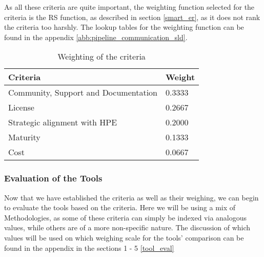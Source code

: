 As all these criteria are quite important, the weighting function selected for the criteria is the \ac{RS} function, as described in section \ref{smart_er}, 
as it does not rank the criteria too harshly.
The lookup tables for the weighting function can be found in the appendix \ref{abb:pipeline_communication_sld}.

\begin{table}[htb]
    \centering
    \begin{tabular}{|l|l|} \hline
        \textbf{Criteria}                       & \textbf{Weight}       \\ \hline
        Community, Support and  Documentation   &  0.3333               \\ \hline
        License                                 &  0.2667               \\ \hline
        Strategic alignment with \ac{HPE}       &  0.2000               \\ \hline
        Maturity                                &  0.1333               \\ \hline
        Cost                                    &  0.0667               \\ \hline
    \end{tabular}
    \caption{Weighting of the criteria}
    \label{tab:weighting_of_the_criteria}
\end{table}

\subsubsection{Evaluation of the Tools}

Now that we have established the criteria as well as their weighing, we can begin to evaluate the tools based on the criteria.
Here we will be using a mix of Methodologies, as some of these criteria can simply be indexed via analogous values, while others are of a more non-specific nature.
The discussion of which values will be used on which weighing scale for the tools' comparison can be found in the appendix in the sections 1 - 5 \ref{tool_eval}


